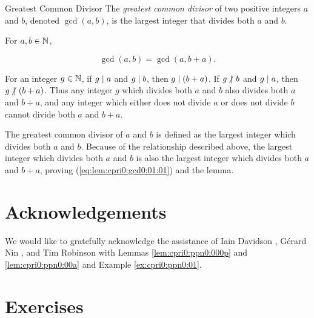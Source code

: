 \begin{vworkdefinitionstatementpar}{Greatest Common Divisor}
\label{def:cpri0:gcd0:01}
The \emph{greatest common divisor} of two positive integers 
$a$ and $b$, denoted $\gcd(a,b)$, is the largest integer
that divides both $a$ and $b$.
\end{vworkdefinitionstatementpar}

\begin{vworklemmastatement}
\label{lem:cpri0:gcd0:01}
For $a,b \in {\mathbb{N}}$,

\begin{equation}
\label{eq:lem:cpri0:gcd0:01:01}
\gcd(a,b) = \gcd(a, b + a). 
\end{equation}
\end{vworklemmastatement}
\begin{vworklemmaproof}
For an integer $g \in {\mathbb{N}}$, if 
$g \mid a$ and $g \mid b$, then
$g \mid (b+a)$.  If $g \hspace{-0.125em}\not\hspace{0.245em}\mid\hspace{0.135em} b$
and $g \mid a$, then $g \hspace{-0.125em}\not\hspace{0.245em}\mid\hspace{0.135em} (b+a)$.
Thus any integer
$g$ which divides both $a$ and $b$ also divides both
$a$ and $b+a$, and any integer which either does not
divide $a$ or does not divide $b$ cannot divide
both $a$ and $b+a$.

The greatest common divisor of $a$ and $b$ is defined as the 
largest integer which divides both $a$ and $b$.  Because of 
the relationship described above, the largest integer which 
divides both $a$ and $b$ is also the largest integer which
divides both $a$ and $b+a$, proving 
(\ref{eq:lem:cpri0:gcd0:01:01}) and the lemma.
\end{vworklemmaproof}
\vworklemmafooter{}




\section{Acknowledgements}

We would like to gratefully acknowledge the assistance of 
Iain Davidson \cite{bibref:i:iaindavidson},
G\'erard Nin \cite{bibref:i:gerardnin},
and Tim Robinson \cite{bibref:i:timrobinson}
with Lemmas \ref{lem:cpri0:ppn0:000p} and \ref{lem:cpri0:ppn0:00a}
and Example \ref{ex:cpri0:ppn0:01}.


\section{Exercises}


